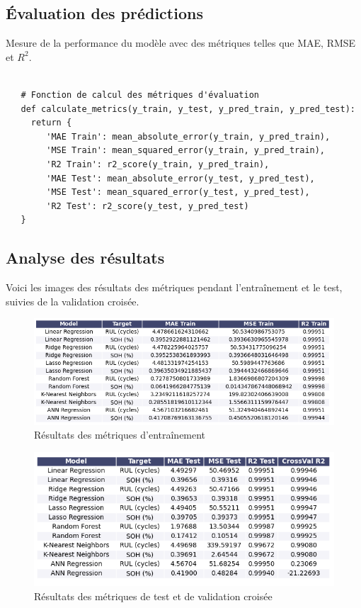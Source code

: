 \subsection{Évaluation des prédictions}
Mesure de la performance du modèle avec des métriques telles que MAE, RMSE et $R^2$.
\begin{verbatim}

   # Fonction de calcul des métriques d'évaluation
   def calculate_metrics(y_train, y_test, y_pred_train, y_pred_test):
     return {
     	'MAE Train': mean_absolute_error(y_train, y_pred_train),
     	'MSE Train': mean_squared_error(y_train, y_pred_train),
     	'R2 Train': r2_score(y_train, y_pred_train),
     	'MAE Test': mean_absolute_error(y_test, y_pred_test),
     	'MSE Test': mean_squared_error(y_test, y_pred_test),
     	'R2 Test': r2_score(y_test, y_pred_test)
   }
\end{verbatim}


\subsection{Analyse des résultats}

Voici les images des résultats des métriques pendant l'entraînement et le test, suivies de la validation croisée.
\begin{figure}[H]
	\centering
	\includegraphics[width=17cm]{./img/resultats/Train.png}
	\caption{Résultats des métriques d'entraînement}
	\label{fig:train_metrics}
\end{figure}

\begin{figure}[H]
	\centering
	\includegraphics[width=17cm]{./img/resultats/train.png}
	\caption{Résultats des métriques de test et de validation croisée}
	\label{fig:test_validation_metrics}
\end{figure}

